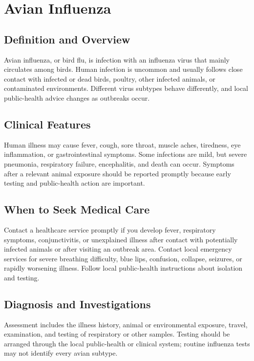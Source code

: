 \chapter{Avian Influenza}

\section*{Definition and Overview}
Avian influenza, or bird flu, is infection with an influenza virus that mainly circulates among birds. Human infection is uncommon and usually follows close contact with infected or dead birds, poultry, other infected animals, or contaminated environments. Different virus subtypes behave differently, and local public-health advice changes as outbreaks occur.

\section*{Clinical Features}
Human illness may cause fever, cough, sore throat, muscle aches, tiredness, eye inflammation, or gastrointestinal symptoms. Some infections are mild, but severe pneumonia, respiratory failure, encephalitis, and death can occur. Symptoms after a relevant animal exposure should be reported promptly because early testing and public-health action are important.

\section*{When to Seek Medical Care}
Contact a healthcare service promptly if you develop fever, respiratory symptoms, conjunctivitis, or unexplained illness after contact with potentially infected animals or after visiting an outbreak area. Contact local emergency services for severe breathing difficulty, blue lips, confusion, collapse, seizures, or rapidly worsening illness. Follow local public-health instructions about isolation and testing.

\section*{Diagnosis and Investigations}
Assessment includes the illness history, animal or environmental exposure, travel, examination, and testing of respiratory or other samples. Testing should be arranged through the local public-health or clinical system; routine influenza tests may not identify every avian subtype.

